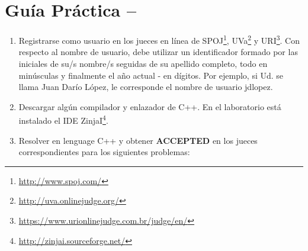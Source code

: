




\section*{Gu\'ia Pr\'actica \numguia -- \nombreguia}

\begin{enumerate}[1 -]


	\item Registrarse como usuario en los jueces en línea de SPOJ\footnote{\href{http://www.spoj.com/} {http://www.spoj.com/}}, UVa\footnote{\href{http://uva.onlinejudge.org/} {http://uva.onlinejudge.org/}} y URI\footnote{\href{https://www.urionlinejudge.com.br/judge/en/} {https://www.urionlinejudge.com.br/judge/en/}}.
Con respecto al nombre de usuario, debe utilizar un identificador formado por las iniciales de su/s nombre/s seguidas de su apellido completo, todo en minúsculas y finalmente el año actual - en dígitos. Por ejemplo, si Ud. se llama Juan Darío López, le corresponde el nombre de usuario jdlopez\anio.

	\item Descargar alg\'un compilador y enlazador de C++. En el laboratorio est\'a instalado el IDE ZinjaI\footnote{\href{http://zinjai.sourceforge.net/} {http://zinjai.sourceforge.net/}}.
	
	\item Resolver en lenguage C++ y obtener \textbf{ACCEPTED} en los jueces correspondientes para los siguientes problemas:
	

\end{enumerate}
